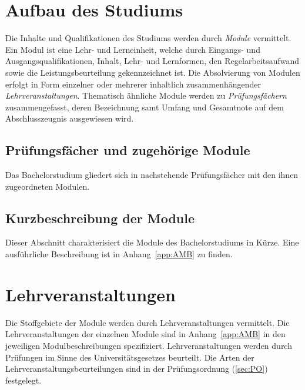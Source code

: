 %

\section{Aufbau des Studiums}\label{sec:AS}

Die Inhalte und Qualifikationen des Studiums werden durch
\emph{Module} vermittelt. Ein Modul ist eine Lehr- und Lerneinheit,
welche durch Eingangs- und Ausgangsqualifikationen, Inhalt, Lehr- und
Lernformen, den Regelarbeitsaufwand sowie die Leistungsbeurteilung
gekennzeichnet ist. Die Absolvierung von Modulen erfolgt in Form
einzelner oder mehrerer inhaltlich zusammenhängender
\emph{Lehrveranstaltungen}.  Thematisch ähnliche Module werden zu
\emph{Prüfungsfächern} zusammengefasst, deren Bezeichnung samt Umfang
und Gesamtnote auf dem Abschlusszeugnis ausgewiesen wird.

\subsection*{Prüfungsfächer und zugehörige Module}

Das Bachelorstudium \emph{} gliedert sich in
nachstehende Prüfungsfächer mit den ihnen zugeordneten Modulen.
%

\subsection*{Kurzbeschreibung der Module}

Dieser Abschnitt charakterisiert die Module des Bachelorstudiums
\emph{} in Kürze. Eine ausführliche Beschreibung ist in
Anhang~\ref{app:AMB} zu finden.

%

\section{Lehrveranstaltungen}\label{sec:LVS}

Die Stoffgebiete der Module werden durch Lehrveranstaltungen
vermittelt. Die Lehrveranstaltungen der einzelnen Module sind in
Anhang~\ref{app:AMB} in den jeweiligen Modulbeschreibungen
spezifiziert.  Lehrveranstaltungen werden durch Prüfungen im Sinne des
Universitätsgesetzes beurteilt.  Die Arten der
Lehrveranstaltungsbeurteilungen sind in der Prüfungsordnung
(\ref{sec:PO}) festgelegt.

